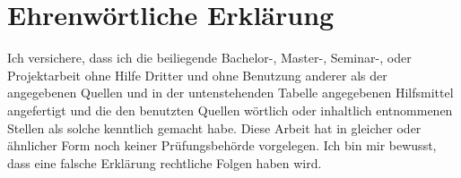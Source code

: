 \section*{Ehrenwörtliche Erklärung}

Ich versichere, dass ich die beiliegende Bachelor-, Master-, Seminar-, oder
Projektarbeit ohne Hilfe Dritter und ohne Benutzung anderer als der angegebenen
Quellen und in der untenstehenden Tabelle angegebenen Hilfsmittel angefertigt
und die den benutzten Quellen wörtlich oder inhaltlich entnommenen Stellen als
solche kenntlich gemacht habe. Diese Arbeit hat in gleicher oder ähnlicher Form
noch keiner Prüfungsbehörde vorgelegen. Ich bin mir bewusst, dass eine falsche
Erklärung rechtliche Folgen haben wird.

%
%
